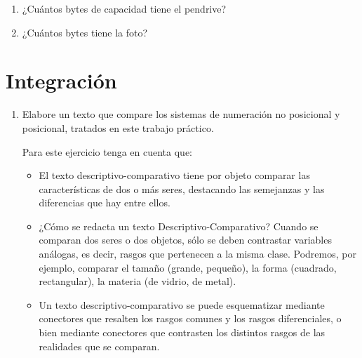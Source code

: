 \documentclass[12pt]{article}
\begin{document}
\begin{enumerate}
        \begin{enumerate}

            \item ¿Cuántos bytes de capacidad tiene el pendrive?

            \item ¿Cuántos bytes tiene la foto?

        \end{enumerate}

    \end{enumerate}

\section{Integración}

    \begin{enumerate}

        \item Elabore un texto que compare los sistemas de numeración no
            posicional y posicional, tratados en este trabajo práctico.

            Para este ejercicio tenga en cuenta que:

            \begin{itemize}

                \item El texto descriptivo-comparativo tiene por objeto
                    comparar las características de dos o más seres,
                    destacando las semejanzas y las diferencias que hay entre
                    ellos.

                \item ¿Cómo se redacta un texto Descriptivo-Comparativo?
                    Cuando se comparan dos seres o dos objetos, sólo se deben
                    contrastar variables análogas, es decir, rasgos que
                    pertenecen a la misma clase. Podremos, por ejemplo,
                    comparar el tamaño (grande, pequeño), la forma (cuadrado,
                    rectangular), la materia (de vidrio, de metal).

                \item Un texto descriptivo-comparativo se puede esquematizar
                    mediante conectores que resalten los rasgos comunes y los
                    rasgos diferenciales, o bien mediante conectores que
                    contrasten los distintos rasgos de las realidades que se
                    comparan.


\end{itemize}
\end{enumerate}
\end{document}
